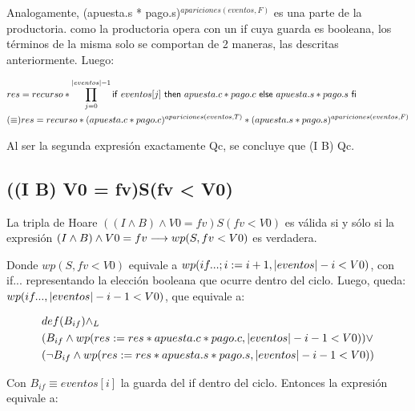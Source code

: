 \documentclass[10pt,a4paper]{article}
\begin{document}
\vspace{0.3cm}
	 
 Analogamente, (apuesta.s * pago.s)$^{apariciones(eventos, F)}$ es una parte de la productoria. como la productoria
 opera con un if cuya guarda es booleana, los términos de la misma solo se comportan de 2 maneras, las descritas anteriormente.
 Luego:
   
\begin{equation}
\begin{split}
	& res = recurso * \prod\limits_{j=0}^{|eventos|-1} \mathsf{if}\ eventos[j]\ \mathsf{then}\ apuesta.c * pago.c\ \mathsf{else}\ apuesta.s * pago.s\ \mathsf{fi}\\
	& (\equiv) res = recurso * (apuesta.c * pago.c)^{apariciones(eventos, T)} * (apuesta.s * pago.s)^{apariciones(eventos, F)}
\end{split}
\end{equation}
   
 Al ser la segunda expresión exactamente Qc, se concluye que (I \land \neg B) \implica Qc.
   
\subsection{((I \land B) \land V0 = fv)S(fv < V0)}
   
 La tripla de Hoare $((I \land B) \land V0 = fv)S(fv < V0)$ es válida si y sólo si la expresión
 $(I \land B) \land V0 = fv \longrightarrow wp(S,fv < V0)$ es verdadera.
   
\vspace{0.3cm}
   
 Donde $wp(S,fv < V0)$ equivale a $wp(if...; i:= i + 1, |eventos| -i < V0)$,
 con if... representando la elección booleana que ocurre dentro del ciclo.
 Luego, queda: $wp(if..., |eventos| -i - 1 < V0)$, que equivale a:
   
\begin{equation}
\begin{split}
	& def(B_{if}) \land _L\\
	& ( B_{if} \land wp(res:= res*apuesta.c*pago.c , |eventos| -i - 1 < V0)) \lor\\
	& (\neg B_{if} \land wp(res:= res*apuesta.s*pago.s , |eventos| -i - 1 < V0))
\end{split}
\end{equation}
   
 Con $B_{if} \equiv eventos[i]$ la guarda del if dentro del ciclo. Entonces la expresión equivale a:
   
\end{document}
